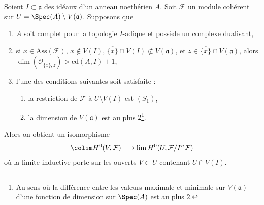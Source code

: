 \begin{lemma}
\label{lemma-application-H0-pre}
Soient $I \subset \mathfrak a$ des idéaux d'un anneau noethérien $A$.
Soit $\mathcal{F}$ un module cohérent sur
$U = \Spec(A) \setminus V(\mathfrak a)$.
Supposons que
\begin{enumerate}
\item $A$ soit complet pour la topologie $I$-adique et possède un complexe dualisant,
\item si $x \in \text{Ass}(\mathcal{F})$, $x \not \in V(I)$,
$\overline{\{x\}} \cap V(I) \not \subset V(\mathfrak a)$,
et $z \in \overline{\{x\}} \cap V(\mathfrak a)$, alors
$\dim(\mathcal{O}_{\overline{\{x\}}, z}) > \text{cd}(A, I) + 1$,
\item l'une des conditions suivantes soit satisfaite :
\begin{enumerate}
\item la restriction de $\mathcal{F}$ à $U \setminus V(I)$ est $(S_1)$,
\item la dimension de $V(\mathfrak a)$ est au plus $2$\footnote{Au
sens où la différence entre les valeurs maximale et minimale
sur $V(\mathfrak a)$ d'une fonction de dimension sur $\Spec(A)$ est au plus $2$.}.
\end{enumerate}
\end{enumerate}
Alors on obtient un isomorphisme
$$
\colim H^0(V, \mathcal{F})
\longrightarrow
\lim H^0(U, \mathcal{F}/I^n\mathcal{F})
$$
où la limite inductive porte sur les ouverts $V \subset U$ contenant $U \cap V(I)$.
\end{lemma}

